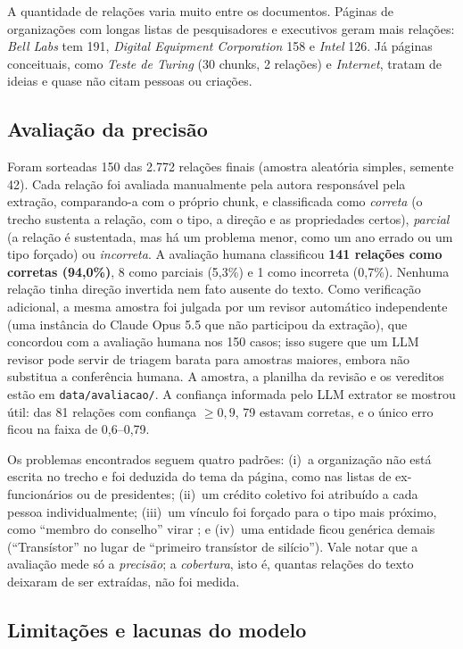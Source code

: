 A quantidade de relações varia muito entre os documentos. Páginas de organizações com longas listas de pesquisadores e executivos geram mais relações: \emph{Bell Labs} tem 191, \emph{Digital Equipment Corporation} 158 e \emph{Intel} 126. Já páginas conceituais, como \emph{Teste de Turing} (30 chunks, 2 relações) e \emph{Internet}, tratam de ideias e quase não citam pessoas ou criações.

\subsection{Avaliação da precisão}

Foram sorteadas 150 das 2.772 relações finais (amostra aleatória simples, semente 42). Cada relação foi avaliada manualmente pela autora responsável pela extração, comparando-a com o próprio chunk, e classificada como \emph{correta} (o trecho sustenta a relação, com o tipo, a direção e as propriedades certos), \emph{parcial} (a relação é sustentada, mas há um problema menor, como um ano errado ou um tipo forçado) ou \emph{incorreta}. A avaliação humana classificou \textbf{141 relações como corretas (94,0\%)}, 8 como parciais (5,3\%) e 1 como incorreta (0,7\%). Nenhuma relação tinha direção invertida nem fato ausente do texto. Como verificação adicional, a mesma amostra foi julgada por um revisor automático independente (uma instância do Claude Opus 5.5 que não participou da extração), que concordou com a avaliação humana nos 150 casos; isso sugere que um LLM revisor pode servir de triagem barata para amostras maiores, embora não substitua a conferência humana. A amostra, a planilha da revisão e os vereditos estão em \texttt{data/avaliacao/}. A confiança informada pelo LLM extrator se mostrou útil: das 81 relações com confiança $\geq 0{,}9$, 79 estavam corretas, e o único erro ficou na faixa de 0,6--0,79.

Os problemas encontrados seguem quatro padrões: (i)~a organização não está escrita no trecho e foi deduzida do tema da página, como nas listas de ex-funcionários ou de presidentes; (ii)~um crédito coletivo foi atribuído a cada pessoa individualmente; (iii)~um vínculo foi forçado para o tipo mais próximo, como ``membro do conselho'' virar ; e (iv)~uma entidade ficou genérica demais (``Transístor'' no lugar de ``primeiro transístor de silício''). Vale notar que a avaliação mede só a \emph{precisão}; a \emph{cobertura}, isto é, quantas relações do texto deixaram de ser extraídas, não foi medida.

\subsection{Limitações e lacunas do modelo}

